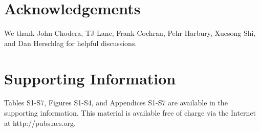 \documentclass[journal=jacsat,manuscript=article]{achemso}
\begin{document}
\section*{Acknowledgements}

We thank John Chodera, TJ Lane, Frank Cochran, Pehr Harbury, Xuesong Shi, and Dan Herschlag for helpful discussions.  

\section*{Supporting Information}

Tables S1-S7, Figures S1-S4, and Appendices S1-S7 are available in the supporting information.  This material is available free of charge via the Internet at http://pubs.acs.org.

\clearpage
\end{document}
